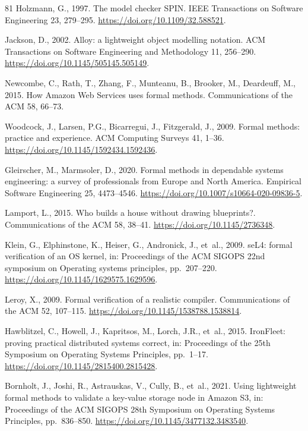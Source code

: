 \documentclass[final,5p,times,twocolumn,number]{elsarticle}
\begin{document}
\begin{thebibliography}{81}
Holzmann, G., 1997. The model checker SPIN. IEEE Transactions on Software Engineering 23, 279--295. \url{https://doi.org/10.1109/32.588521}.

Jackson, D., 2002. Alloy: a lightweight object modelling notation. ACM Transactions on Software Engineering and Methodology 11, 256--290. \url{https://doi.org/10.1145/505145.505149}.

Newcombe, C., Rath, T., Zhang, F., Munteanu, B., Brooker, M., Deardeuff, M., 2015. How
Amazon Web Services uses formal methods. Communications of the ACM 58, 66--73.

Woodcock, J., Larsen, P.G., Bicarregui, J., Fitzgerald, J., 2009. Formal methods: practice and experience. ACM Computing Surveys 41, 1--36. \url{https://doi.org/10.1145/1592434.1592436}.

Gleirscher, M., Marmsoler, D., 2020. Formal methods in dependable systems engineering: a survey of professionals from Europe and North America. Empirical Software Engineering 25, 4473--4546. \url{https://doi.org/10.1007/s10664-020-09836-5}.

Lamport, L., 2015. Who builds a house without drawing blueprints?. Communications of the ACM 58, 38--41. \url{https://doi.org/10.1145/2736348}.

Klein, G., Elphinstone, K., Heiser, G., Andronick, J., et~al., 2009. seL4: formal verification of an OS kernel, in: Proceedings of the ACM SIGOPS 22nd symposium on Operating systems principles, pp.~207--220. \url{https://doi.org/10.1145/1629575.1629596}.

Leroy, X., 2009. Formal verification of a realistic compiler. Communications of the ACM 52, 107--115. \url{https://doi.org/10.1145/1538788.1538814}.

Hawblitzel, C., Howell, J., Kapritsos, M., Lorch, J.R., et~al., 2015. IronFleet: proving practical distributed systems correct, in: Proceedings of the 25th Symposium on Operating Systems Principles, pp.~1--17. \url{https://doi.org/10.1145/2815400.2815428}.

Bornholt, J., Joshi, R., Astrauskas, V., Cully, B., et~al., 2021. Using lightweight formal methods to validate a key-value storage node in Amazon S3, in: Proceedings of the ACM SIGOPS 28th Symposium on Operating Systems Principles, pp.~836--850. \url{https://doi.org/10.1145/3477132.3483540}.


\end{thebibliography}
\end{document}
